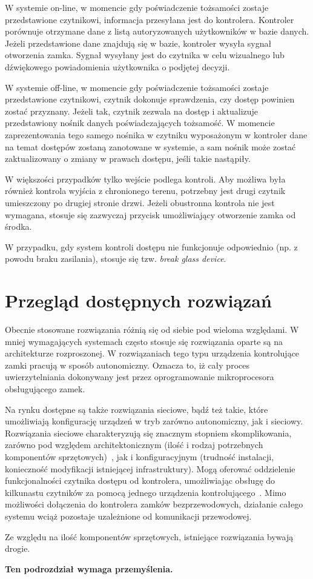 		W systemie on-line, w momencie gdy poświadczenie tożsamości zostaje przedstawione czytnikowi, informacja przesyłana jest do kontrolera. Kontroler porównuje otrzymane dane z listą autoryzowanych użytkowników w bazie danych. Jeżeli przedstawione dane znajdują się w bazie, kontroler wysyła sygnał otworzenia zamka. Sygnał wysyłany jest do czytnika w celu wizualnego lub dźwiękowego powiadomienia użytkownika o podjętej decyzji.~\cite{bsia2016}

		W systemie off-line, w momencie gdy poświadczenie tożsamości zostaje przedstawione czytnikowi, czytnik dokonuje sprawdzenia, czy dostęp powinien zostać przyznany. Jeżeli tak, czytnik zezwala na dostęp i aktualizuje przedstawiony nośnik danych poświadczających tożsamość. W momencie zaprezentowania tego samego nośnika w czytniku wyposażonym w kontroler dane na temat dostępów zostaną zanotowane w systemie, a sam nośnik może zostać zaktualizowany o zmiany w prawach dostępu, jeśli takie nastąpiły.~\cite{bsia2016}

		W większości przypadków tylko wejście podlega kontroli. Aby możliwa była również kontrola wyjścia z chronionego terenu, potrzebny jest drugi czytnik umieszczony po drugiej stronie drzwi. Jeżeli obustronna kontrola nie jest wymagana, stosuje się zazwyczaj przycisk umożliwiający otworzenie zamka od środka.~\cite{bsia2016}

		W przypadku, gdy system kontroli dostępu nie funkcjonuje odpowiednio (np. z powodu braku zasilania), stosuje się tzw. \textit{break glass device}.~\cite{bsia2016}

	\section{Przegląd dostępnych rozwiązań}

		Obecnie stosowane rozwiązania różnią się od siebie pod wieloma względami. W mniej wymagających systemach często stosuje się rozwiązania oparte są na architekturze rozproszonej. W rozwiązaniach tego typu urządzenia kontrolujące zamki pracują w sposób autonomiczny. Oznacza to, iż cały proces uwierzytelniania dokonywany jest przez oprogramowanie mikroprocesora obsługującego zamek.

		Na rynku dostępne są także rozwiązania sieciowe, bądź też takie, które umożliwiają konfigurację urządzeń w tryb zarówno autonomiczny, jak i sieciowy. Rozwiązania sieciowe charakteryzują się znacznym stopniem skomplikowania, zarówno pod względem architektonicznym (ilość i rodzaj potrzebnych komponentów sprzętowych)~\cite{racs5}, jak i konfiguracyjnym (trudność instalacji, konieczność modyfikacji istniejącej infrastruktury). Mogą oferować oddzielenie funkcjonalności czytnika dostępu od kontrolera, umożliwiając obsługę do kilkunastu czytników za pomocą jednego urządzenia kontrolującego~\cite{racs5}. Mimo możliwości dołączenia do kontrolera zamków bezprzewodowych, działanie całego systemu wciąż pozostaje uzależnione od komunikacji przewodowej.

		Ze względu na ilość komponentów sprzętowych, istniejące rozwiązania bywają drogie.

		\textbf{Ten podrozdział wymaga przemyślenia.}